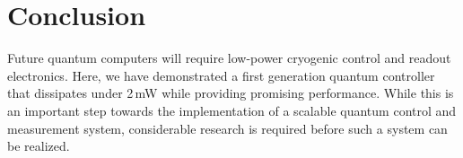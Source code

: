 \documentclass[journal]{IEEEtran}
\newcommand{\CR}[1]{{\color{black}#1}}
\begin{document}
\begin{table}[bt!]
\begin{center}
\end{center}
\end{table}
\section{Conclusion}
Future quantum computers will require low-power cryogenic control and readout electronics. Here, we have demonstrated a first generation quantum controller that dissipates under 2\,mW while providing \CR{promising} performance. While this is an important step towards the implementation of a scalable quantum control and measurement system, considerable research is required before such a system can be realized. 
\end{document}
